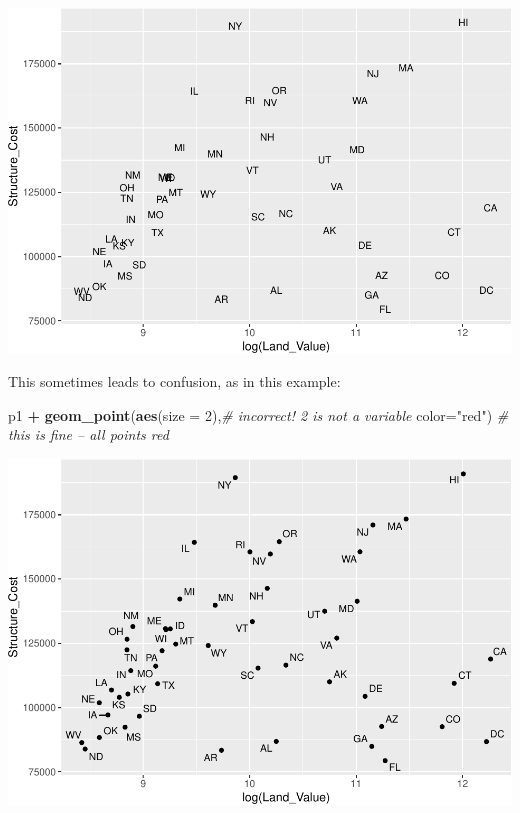 \documentclass[]{book}
\newenvironment{Shaded}{\begin{snugshade}}{\end{snugshade}}
\newcommand{\CommentTok}[1]{\textcolor[rgb]{0.56,0.35,0.01}{\textit{#1}}}
\newcommand{\DataTypeTok}[1]{\textcolor[rgb]{0.13,0.29,0.53}{#1}}
\newcommand{\DecValTok}[1]{\textcolor[rgb]{0.00,0.00,0.81}{#1}}
\newcommand{\KeywordTok}[1]{\textcolor[rgb]{0.13,0.29,0.53}{\textbf{#1}}}
\newcommand{\NormalTok}[1]{#1}
\newcommand{\OperatorTok}[1]{\textcolor[rgb]{0.81,0.36,0.00}{\textbf{#1}}}
\newcommand{\StringTok}[1]{\textcolor[rgb]{0.31,0.60,0.02}{#1}}
\begin{document}
\includegraphics{R/Rgraphics/figures/unnamed-chunk-150-1.pdf}

This sometimes leads to confusion, as in this example:

\begin{Shaded}
\begin{Highlighting}[]
\NormalTok{p1 }\OperatorTok{+}
\StringTok{  }\KeywordTok{geom_point}\NormalTok{(}\KeywordTok{aes}\NormalTok{(}\DataTypeTok{size =} \DecValTok{2}\NormalTok{),}\CommentTok{# incorrect! 2 is not a variable}
             \DataTypeTok{color=}\StringTok{"red"}\NormalTok{) }\CommentTok{# this is fine -- all points red}
\end{Highlighting}
\end{Shaded}

\includegraphics{R/Rgraphics/figures/unnamed-chunk-151-1.pdf}
\end{document}
